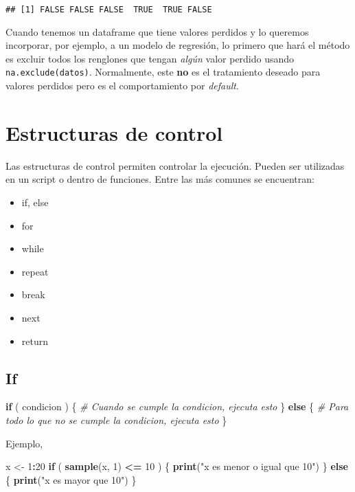 \documentclass[]{article}
\newenvironment{Shaded}{\begin{snugshade}}{\end{snugshade}}
\newcommand{\KeywordTok}[1]{\textcolor[rgb]{0.13,0.29,0.53}{\textbf{#1}}}
\newcommand{\DecValTok}[1]{\textcolor[rgb]{0.00,0.00,0.81}{#1}}
\newcommand{\StringTok}[1]{\textcolor[rgb]{0.31,0.60,0.02}{#1}}
\newcommand{\CommentTok}[1]{\textcolor[rgb]{0.56,0.35,0.01}{\textit{#1}}}
\newcommand{\ControlFlowTok}[1]{\textcolor[rgb]{0.13,0.29,0.53}{\textbf{#1}}}
\newcommand{\OperatorTok}[1]{\textcolor[rgb]{0.81,0.36,0.00}{\textbf{#1}}}
\newcommand{\NormalTok}[1]{#1}
\providecommand{\tightlist}{%
  \setlength{\itemsep}{0pt}\setlength{\parskip}{0pt}}
\begin{document}
\begin{verbatim}
## [1] FALSE FALSE FALSE  TRUE  TRUE FALSE
\end{verbatim}

Cuando tenemos un dataframe que tiene valores perdidos y lo queremos
incorporar, por ejemplo, a un modelo de regresión, lo primero que hará
el método es excluir todos los renglones que tengan \emph{algún} valor
perdido usando \texttt{na.exclude(datos)}. Normalmente, este \textbf{no}
es el tratamiento deseado para valores perdidos pero es el
comportamiento por \emph{default}.

\section{Estructuras de control}\label{estructuras-de-control}

Las estructuras de control permiten controlar la ejecución. Pueden ser
utilizadas en un script o dentro de funciones. Entre las más comunes se
encuentran:

\begin{itemize}
\tightlist
\item
  if, else
\item
  for
\item
  while
\item
  repeat
\item
  break
\item
  next
\item
  return
\end{itemize}

\subsection{If}\label{if}

\begin{Shaded}
\begin{Highlighting}[]
\ControlFlowTok{if}\NormalTok{ ( condicion ) \{}
  \CommentTok{# Cuando se cumple la condicion, ejecuta esto}
\NormalTok{\} }\ControlFlowTok{else}\NormalTok{ \{}
  \CommentTok{# Para todo lo que no se cumple la condicion, ejecuta esto}
\NormalTok{\}}
\end{Highlighting}
\end{Shaded}

Ejemplo,

\begin{Shaded}
\begin{Highlighting}[]
\NormalTok{x <-}\StringTok{ }\DecValTok{1}\OperatorTok{:}\DecValTok{20}
\ControlFlowTok{if}\NormalTok{ ( }\KeywordTok{sample}\NormalTok{(x, }\DecValTok{1}\NormalTok{) }\OperatorTok{<=}\StringTok{ }\DecValTok{10}\NormalTok{ ) \{}
  \KeywordTok{print}\NormalTok{(}\StringTok{"x es menor o igual que 10"}\NormalTok{)}
\NormalTok{\} }\ControlFlowTok{else}\NormalTok{ \{}
  \KeywordTok{print}\NormalTok{(}\StringTok{"x es mayor que 10"}\NormalTok{)}
\NormalTok{\}}
\end{Highlighting}
\end{Shaded}
\end{document}
